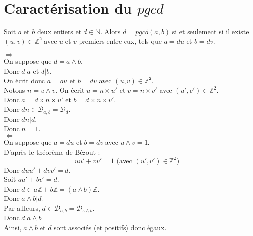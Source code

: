 \documentclass[../main.tex]{subfiles}
\begin{document}
\section{Caractérisation du $pgcd$}
\begin{tcolorbox}[title=Propostion 12.39, title filled=false, colframe=lightblue, colback=lightblue!10!white]
    Soit $a$ et $b$ deux entiers et $d \in \mathbb{N}$. Alors $d = pgcd(a,b)$ si et seulement si il existe $(u, v) \in \mathbb{Z}^2$ avec $u$ et $v$ premiers entre eux, tels que $a = du$ et $b = dv$. 
\end{tcolorbox}

$\boxed{\Rightarrow}$ \\
On suppose que $d = a \wedge b$. \\
Donc $d|a$ et $d|b$. \\
On écrit donc $a = du$ et $b = dv$ avec $(u, v) \in \mathbb{Z}^2$. \\
Notons $n = u \wedge v$. On écrit $u = n \times u'$ et $v = n \times v'$ avec $(u', v') \in \mathbb{Z}^2$.  \\
Donc $a = d \times n \times u'$ et $b = d \times n \times v'$. \\
Donc $dn \in \mathcal{D}_{a,b} = \mathcal{D}_d$. \\
Donc $dn | d$. \\
Donc $n = 1$. \\

$\boxed{\Leftarrow}$ \\
On suppose que $a = du$ et $b = dv$ avec $u \wedge v = 1$. \\
D'après le théorème de Bézout : 
$$uu' + vv' = 1 \text{ (avec $(u', v') \in \mathbb{Z}^2$)}$$
Donc $duu' + dvv' = d$. \\
Soit $au' + bv' = d$. \\
Donc $d \in a \mathbb{Z} + b \mathbb{Z} = (a \wedge b) \mathbb{Z}$. \\
Donc $a \wedge b | d$. \\
Par ailleurs, $d \in \mathcal{D}_{a, b} = \mathcal{D}_{a \wedge b}$. \\
Donc $d | a \wedge b$. \\
Ainsi, $a \wedge b$ et $d$ sont associés (et positifs) donc égaux. 
\end{document}
